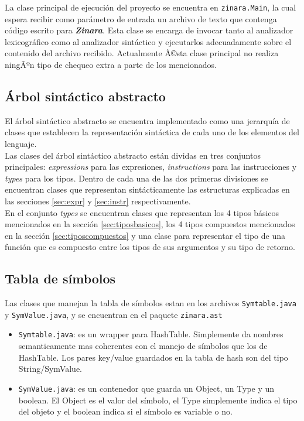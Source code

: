 \documentclass[12pt, spanish]{report}
\begin{document}
La clase principal de ejecuci\'on del proyecto se encuentra en
\texttt{zinara.Main}, la cual espera recibir como par\'ametro de entrada
un archivo de texto que contenga c\'odigo escrito para
\emph{\textbf{Zinara}}. Esta clase se encarga de invocar tanto al
analizador lexicogr\'afico como al analizador sint\'actico y ejecutarlos
adecuadamente sobre el contenido del archivo recibido. Actualmente
Ã©sta clase principal no realiza ningÃºn tipo de chequeo extra a parte
de los mencionados.

\subsection{\'Arbol sint\'actico abstracto}
\label{sec:ast}

El \'arbol sint\'actico abstracto se encuentra implementado como una
jerarqu\'ia de clases que establecen la representaci\'on sint\'actica de
cada uno de los elementos del lenguaje.\\

Las clases del \'arbol sint\'actico abstracto est\'an dividas en tres
conjuntos principales: \emph{expressions} para las expresiones,
\emph{instructions} para las instrucciones y \emph{types} para los
tipos. Dentro de cada una de las dos primeras divisiones se encuentran
clases que representan sint\'acticamente las estructuras explicadas en
las secciones \ref{sec:expr} y \ref{sec:instr} respectivamente.\\

En el conjunto \emph{types} se encuentran clases que representan los 4
tipos b\'asicos mencionados en la secci\'on \ref{sec:tiposbasicos}, los 4
tipos compuestos mencionados en la secci\'on \ref{sec:tiposcompuestos} y una
clase para representar el tipo de una funci\'on que es compuesto entre
los tipos de sus argumentos y su tipo de retorno.

\subsection{Tabla de s\'imbolos}
\label{sec:st}

Las clases que manejan la tabla de s\'imbolos estan en los archivos
\texttt{Symtable.java} y \texttt{SymValue.java}, y se encuentran en el paquete
\texttt{zinara.ast} 

\begin{itemize}
\item \texttt{Symtable.java}: es un wrapper para HashTable. Simplemente
  da nombres semanticamente mas coherentes con el manejo de s\'imbolos
  que los de HashTable. Los pares key/value guardados en la tabla de
  hash son del tipo String/SymValue.

\item \texttt{SymValue.java}: es un contenedor que guarda un Object,
  un Type y un boolean. El Object es el valor del s\'imbolo, el Type
  simplemente indica el tipo del objeto y el boolean indica si el
  s\'imbolo es variable o no.
\end{itemize}
\end{document}

